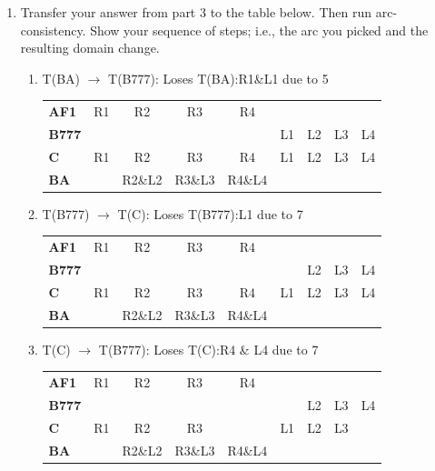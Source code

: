 \documentclass[12pt]{article}
\begin{document}
\begin{enumerate}
\item Transfer your answer from part 3 to the table below. Then run
  arc-consistency.  Show your sequence of steps; i.e., the arc you
  picked and the resulting domain change.



\begin{enumerate}
\item T(BA) $\rightarrow$ T(B777): Loses T(BA):R1\&L1 due to 5
\begin{center}\begin{tabular}{l|cccccccc|}
{\bf AF1}  & R1 & R2 & R3 & R4 & & & & \\ 
{\bf B777} &  &  &  &  & L1 & L2 & L3 & L4 \\ 
{\bf C}    & R1 & R2 & R3 & R4 & L1 & L2 & L3 & L4 \\ 
{\bf BA}   & & R2\&L2 & R3\&L3 & R4\&L4 &  &  &  &  \\ 
\end{tabular}\end{center}

\item T(B777) $\rightarrow$ T(C): Loses T(B777):L1 due to 7

\begin{center}\begin{tabular}{l|cccccccc|}
{\bf AF1}  & R1 & R2 & R3 & R4 & & & & \\ 
{\bf B777} &  &  &  &  & & L2 & L3 & L4 \\ 
{\bf C}    & R1 & R2 & R3 & R4 & L1 & L2 & L3 & L4 \\ 
{\bf BA}   & & R2\&L2 & R3\&L3 & R4\&L4 &  &  &  &  \\ 
\end{tabular}\end{center}

\item T(C) $\rightarrow$ T(B777): Loses T(C):R4 \& L4 due to 7

\begin{center}\begin{tabular}{l|cccccccc|}
{\bf AF1}  & R1 & R2 & R3 & R4 & & & & \\ 
{\bf B777} &  &  &  &  & & L2 & L3 & L4 \\ 
{\bf C}    & R1 & R2 & R3 & & L1 & L2 & L3 & \\ 
{\bf BA}   & & R2\&L2 & R3\&L3 & R4\&L4 &  &  &  &  \\ 
\end{tabular}\end{center}


\end{enumerate}
\end{enumerate}
\end{document}
